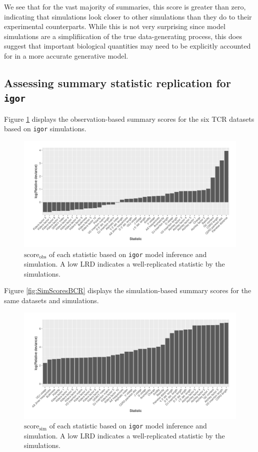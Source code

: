 \documentclass{article}
\begin{document}
We see that for the vast majority of summaries, this score is greater than zero, indicating that simulations look closer to other simulations than they do to their experimental counterparts.
While this is not very surprising since model simulations are a simplifiication of the true data-generating process, this does suggest that important biological quantities may need to be explicitly accounted for in a more accurate generative model.

\subsection*{Assessing summary statistic replication for \texttt{igor}}
Figure \ref{fig:ObsScoresTCR} displays the observation-based summary scores for the six TCR datasets based on \texttt{igor} simulations.

\begin{figure}
    \includegraphics[width=\linewidth]{Figures/obs_score_plot-tcr.pdf}
    \caption{$\text{score}_\text{obs}$ of each statistic based on \texttt{igor} model inference and simulation.
        A low LRD indicates a well-replicated statistic by the simulations.
    }
    \label{fig:ObsScoresTCR}
\end{figure}

Figure \ref{fig:SimScoresBCR} displays the simulation-based summary scores for the same datasets and simulations.
\begin{figure}
    \includegraphics[width=\linewidth]{Figures/sim_score_plot-tcr.pdf}
    \caption{$\text{score}_\text{sim}$ of each statistic based on \texttt{igor} model inference and simulation.
        A low LRD indicates a well-replicated statistic by the simulations.
    }
    \label{fig:SimScoresTCR}
\end{figure}
\end{document}
